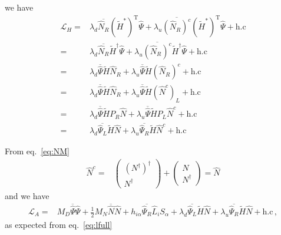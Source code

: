 we have
\begin{align*}
    \mathcal{L}_H=&\lambda_d \overline{\widehat{N}_R} \left( \widetilde{H}^{*} \right)^{\operatorname{T}} \widehat{\Psi}
+\lambda_u \overline{(\widehat{N}_R)^c}\left( \widetilde{H}^{*} \right)^{\operatorname{T}}  \widehat{\Psi}+\text{h.c}\nonumber\\
  =&\lambda_d \overline{\widehat{N}_R} \widetilde{H}^{\dagger} \widehat{\Psi}
+\lambda_u \overline{(\widehat{N}_R)^c}\widetilde{H}^{\dagger} \widehat{\Psi}+\text{h.c}  \nonumber\\
  =&\lambda_d \overline{ \widehat{\Psi}} \widetilde{H}\widehat{N}_R
+\lambda_u \overline{\widehat{\Psi}} \widetilde{H} (\widehat{N}_R)^{c}+\text{h.c}  \nonumber\\
  =&\lambda_d \overline{ \widehat{\Psi}} \widetilde{H}\widehat{N}_R
+\lambda_u \overline{\widehat{\Psi}} \widetilde{H} (\widehat{N}^c)_L+\text{h.c}  \nonumber\\
  =&\lambda_d \overline{ \widehat{\Psi}} \widetilde{H}P_R\widehat{N}
+\lambda_u \overline{\widehat{\Psi}} \widetilde{H} P_L\widehat{N}^{c}+\text{h.c} \nonumber\\
  =&\lambda_d \overline{ \widehat{\Psi}_L} \widetilde{H}\widehat{N}
+\lambda_u \overline{\widehat{\Psi}_R} \widetilde{H} \widehat{N}^{c}+\text{h.c}
\end{align*}

From eq.~\eqref{eq:NM} 
\begin{align}
  \widehat{N}^{c}=&
\begin{pmatrix}
  \left( N^{\dagger} \right)^{\dagger} \\ 
  N^{\dagger} 
\end{pmatrix}+
\begin{pmatrix}
  N \\ 
  N^{\dagger} 
\end{pmatrix}=\widehat{N}
\end{align}
and we have
\begin{align}
    \mathcal{L}_A=&M_D \overline{\widehat{\Psi}}\widehat{\Psi}+\tfrac{1}{2}M_N\overline{\widehat{N}}\widehat{N}
+h_{i\alpha} \overline{\widehat{\Psi}_{R}} \widehat{L}_i S_{\alpha}
+ \lambda_d \overline{\widehat{\Psi}_L}\widetilde{H} \widehat{N}
+\lambda_u \overline{\widehat{\Psi}_{R}}\widetilde{H}\widehat{N}+\text{h.c}\,,
\end{align}
as expected from eq.~\eqref{eq:lfull}
